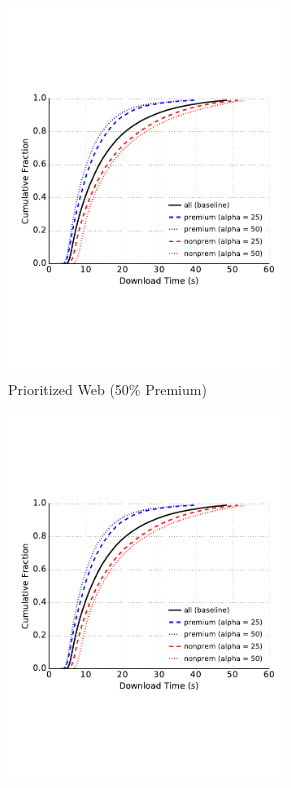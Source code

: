 \begin{figure} \centering
\begin{subfigure}[t]{0.49\textwidth} \centering
\includegraphics[trim={0 3cm 0 3cm}, clip, width=0.8\textwidth]{images/modifier_pr50_web.pdf}
		\caption{Prioritized Web (50\% Premium)}
\label{fig:modifier_pr50_web}
	\end{subfigure}
	\begin{subfigure}[t]{0.49\textwidth} \centering
\includegraphics[trim={0 3cm 0 3cm}, clip, width=0.8\textwidth]{images/modifier_pr25_web.pdf}

\end{subfigure}
\end{figure}
